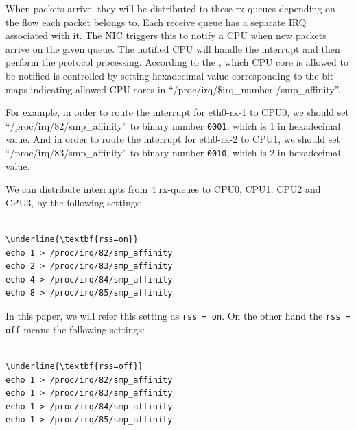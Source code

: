 When packets arrive, they will be distributed to these rx-queues depending on the flow each packet belongs to.
Each receive queue has a separate IRQ associated with it. The NIC triggers
this to notify a CPU when new packets arrive on the given queue.
The notified CPU will handle the interrupt and then perform the protocol processing. 
According to the \cite{TomHerbert}, which CPU core is allowed to be notified is controlled by setting 
hexadecimal value corresponding to the bit maps indicating allowed CPU cores in \enquote{/proc/irq/\$irq\_number /smp\_affinity}.

For example, in order to route the interrupt for eth0-rx-1 to CPU0, 
we should set \enquote{/proc/irq/82/smp\_affinity} 
to binary number {\tt 0001}, which is 1 in hexadecimal value.
And in order to route the interrupt for eth0-rx-2 to CPU1, we 
should set \enquote{/proc/irq/83/smp\_affinity} 
to binary number {\tt 0010}, which is 2 in hexadecimal value.

We can distribute interrupts from 4 rx-queues to CPU0, CPU1, CPU2 and CPU3, by the following settings: 

\begin{center}
\begin{minipage}{0.8\columnwidth}
\begin{Verbatim}[commandchars=\\\{\}]

\underline{\textbf{rss=on}}
echo 1 > /proc/irq/82/smp_affinity
echo 2 > /proc/irq/83/smp_affinity
echo 4 > /proc/irq/84/smp_affinity
echo 8 > /proc/irq/85/smp_affinity

\end{Verbatim}
\end{minipage}
\end{center}

In this paper, we will refer this setting as {\tt rss = on}.
On the other hand the {\tt rss = off} means the following settings:

\begin{center}
\begin{minipage}{0.8\columnwidth}
\begin{Verbatim}[commandchars=\\\{\}]

\underline{\textbf{rss=off}}
echo 1 > /proc/irq/82/smp_affinity
echo 1 > /proc/irq/83/smp_affinity
echo 1 > /proc/irq/84/smp_affinity
echo 1 > /proc/irq/85/smp_affinity

\end{Verbatim}
\end{minipage}
\end{center}

